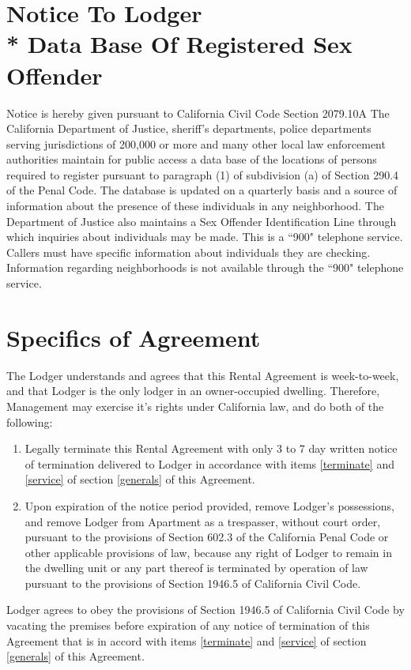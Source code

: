 \documentclass[12pt,letterpaper]{article}
\newcommand{\notice}{Notice To Lodger\\* Data Base Of Registered Sex Offender} %
\newcommand{\specifics}{Specifics of Agreement}			%
\newcommand{\management}{Management}
\newcommand{\apt}{Apartment}
\newcommand{\lodger}{Lodger}
\begin{document}
\newpage
\section{\notice{}} \label{notice}

Notice is hereby given pursuant to California Civil Code Section 2079.10A The California Department of Justice, sheriff's departments, police departments serving jurisdictions of 200,000 or more and many other local law enforcement authorities maintain for public access a data base of the locations of persons required to register pursuant to paragraph (1) of subdivision (a) of Section 290.4 of the Penal Code. The database is updated on a quarterly basis and a source of information about the presence of these individuals in any neighborhood. The Department of Justice also maintains a Sex Offender Identification Line through which inquiries about individuals may be made. This is a ``900" telephone service. Callers must have specific information about individuals they are checking. Information regarding neighborhoods is not available through the ``900" telephone service. 

\newpage
\section{\specifics{}} \label{specifics}

The \lodger{} understands and agrees that this Rental Agreement is week-to-week, and that \lodger{} is the only lodger in an owner-occupied dwelling. Therefore, \management{} may exercise it's rights under California law, and do both of the following: 
\begin{enumerate}
	\item Legally terminate this Rental Agreement with only 3 to 7 day written notice of termination delivered to \lodger{} in accordance with items \ref{terminate} and \ref{service} of section \ref{generals} of this Agreement.
	\item Upon expiration of the notice period provided, remove \lodger{}'s possessions, and remove \lodger{} from \apt{} as a trespasser, without court order, pursuant to the provisions of Section 602.3 of the California Penal Code or other applicable provisions of law, because any right of \lodger{} to remain in the dwelling unit or any part thereof is terminated by operation of law pursuant to the provisions of Section 1946.5 of California Civil Code.
\end{enumerate}

\lodger{} agrees to obey the provisions of Section 1946.5 of California Civil Code by vacating the premises before expiration of any notice of termination of this Agreement that is in accord with items \ref{terminate} and \ref{service} of section \ref{generals} of this Agreement.
\end{document}
